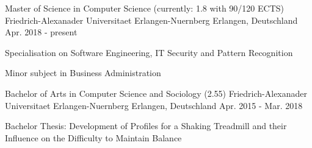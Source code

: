 

\begin{cventries}

  \cventry
    {Master of Science in Computer Science (currently: 1.8 with 90/120 ECTS)} %
    {Friedrich-Alexanader Universitaet Erlangen-Nuernberg} %
    {Erlangen, Deutschland} %
    {Apr. 2018 - present} %
    {
      \begin{cvitems} %
        \item {Specialisation on Software Engineering, IT Security and Pattern Recognition}
        \item {Minor subject in Business Administration}
      \end{cvitems}
    }

    \cventry
    {Bachelor of Arts in Computer Science and Sociology (2.55)} %
    {Friedrich-Alexanader Universitaet Erlangen-Nuernberg} %
    {Erlangen, Deutschland} %
    {Apr. 2015 - Mar. 2018} %
    {
      \begin{cvitems} %
        \item {Bachelor Thesis: Development of Profiles for a Shaking Treadmill and their Influence on the Difficulty to Maintain Balance}
      \end{cvitems}
    }

\end{cventries}
